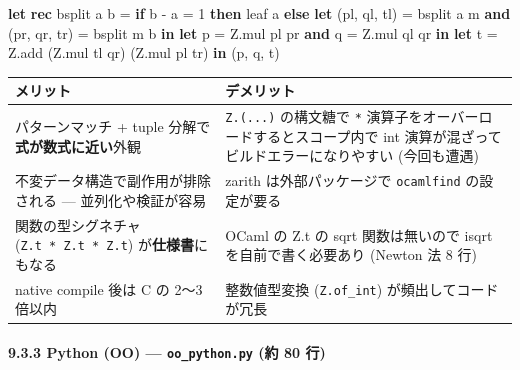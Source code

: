 \documentclass[
]{ltjsarticle}
\newenvironment{Shaded}{}{}
\newcommand{\DecValTok}[1]{\textcolor[rgb]{0.25,0.63,0.44}{#1}}
\newcommand{\KeywordTok}[1]{\textcolor[rgb]{0.00,0.44,0.13}{\textbf{#1}}}
\newcommand{\NormalTok}[1]{#1}
\newcounter{none} %
\begin{document}
\begin{Shaded}
\begin{Highlighting}[]
\KeywordTok{let} \KeywordTok{rec}\NormalTok{ bsplit a b =}
  \KeywordTok{if}\NormalTok{ b {-} a = }\DecValTok{1} \KeywordTok{then}\NormalTok{ leaf a}
  \KeywordTok{else}
    \KeywordTok{let}\NormalTok{ (pl, ql, tl) = bsplit a m}
    \KeywordTok{and}\NormalTok{ (pr, qr, tr) = bsplit m b }\KeywordTok{in}
    \KeywordTok{let}\NormalTok{ p = Z.mul pl pr }\KeywordTok{and}\NormalTok{ q = Z.mul ql qr }\KeywordTok{in}
    \KeywordTok{let}\NormalTok{ t = Z.add (Z.mul tl qr) (Z.mul pl tr) }\KeywordTok{in}
\NormalTok{    (p, q, t)}
\end{Highlighting}
\end{Shaded}

{\def\LTcaptype{none} %
\begin{longtable}[]{@{}
  >{\raggedright\arraybackslash}p{}
  >{\raggedright\arraybackslash}p{}@{}}
\toprule\noalign{}
\begin{minipage}[b]{\linewidth}\raggedright
メリット
\end{minipage} & \begin{minipage}[b]{\linewidth}\raggedright
デメリット
\end{minipage} \\
\midrule\noalign{}
\endhead
\bottomrule\noalign{}
\endlastfoot
パターンマッチ + tuple 分解で\textbf{式が数式に近い}外観 &
\texttt{Z.(...)} の構文糖で \texttt{*}
演算子をオーバーロードするとスコープ内で int
演算が混ざってビルドエラーになりやすい (今回も遭遇) \\
不変データ構造で副作用が排除される --- 並列化や検証が容易 & zarith
は外部パッケージで \texttt{ocamlfind} の設定が要る \\
関数の型シグネチャ (\texttt{Z.t\ *\ Z.t\ *\ Z.t})
が\textbf{仕様書}にもなる & OCaml の Z.t の sqrt 関数は無いので isqrt
を自前で書く必要あり (Newton 法 8 行) \\
native compile 後は C の 2〜3 倍以内 & 整数値型変換 (\texttt{Z.of\_int})
が頻出してコードが冗長 \\
\end{longtable}
}

\paragraph{\texorpdfstring{9.3.3 Python (OO) --- \texttt{oo\_python.py}
(約 80
行)}{9.3.3 Python (OO) --- oo\_python.py (約 80 行)}}\label{python-oo-oo_python.py-ux7d04-80-ux884c}
\end{document}
